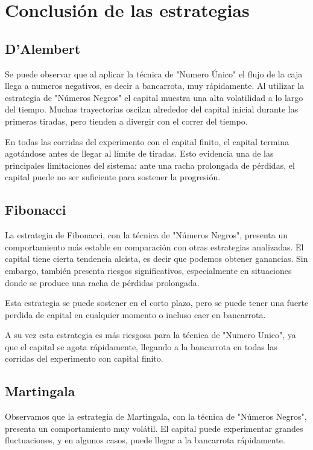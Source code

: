 \documentclass{article}
\begin{document}
\section{Conclusión de las estrategias}
\subsection{D'Alembert}
Se puede observar que al aplicar la técnica de "Numero Único" el flujo de la caja llega a numeros negativos, es decir a bancarrota, muy rápidamente.
Al utilizar la estrategia de "Números Negros" el capital muestra una alta volatilidad a lo largo del tiempo. Muchas trayectorias oscilan alrededor del capital inicial durante las primeras tiradas, pero tienden a divergir con el correr del tiempo.

En todas las corridas del experimento con el capital finito, el capital termina agotándose antes de llegar al límite de tiradas. Esto evidencia una de las principales limitaciones del sistema: ante una racha prolongada de pérdidas, el capital puede no ser suficiente para sostener la progresión.

\subsection{Fibonacci}
La estrategia de Fibonacci, con la técnica de "Números Negros", presenta un comportamiento más estable en comparación con otras estrategias analizadas. El capital tiene cierta tendencia alcista, es decir que podemos obtener ganancias. Sin embargo, también presenta riesgos significativos, especialmente en situaciones donde se produce una racha de pérdidas prolongada.

Esta estrategia se puede sostener en el corto plazo, pero se puede tener una fuerte perdida de capital en cualquier momento o incluso caer en bancarrota.

A su vez esta estrategia es más riesgosa para la técnica de "Numero Unico", ya que el capital se agota rápidamente, llegando a la bancarrota en todas las corridas del experimento con capital finito.


\subsection{Martingala}
Observamos que la estrategia de Martingala, con la técnica de "Números Negros", presenta un comportamiento muy volátil. El capital puede experimentar grandes fluctuaciones, y en algunos casos, puede llegar a la bancarrota rápidamente.
\end{document}
